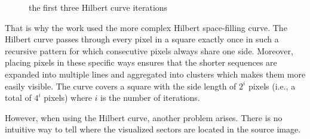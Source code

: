 \documentclass[
  digital, %
  oneside, %
  lof,     %
  lot,     %
]{fithesis4}
\begin{document}
\begin{figure}[H]
\begin{center}
\begin{minipage}{.3\textwidth}
\begin{center}
      \end{center}
    \end{minipage}
  \end{center}
  \caption{the first three Hilbert curve iterations}
  \label{fig:hilbertiters}
\end{figure}

That is why the work \cite{cortesi11} used the more complex Hilbert space-filling curve.
The Hilbert curve passes through every pixel in a square exactly once in such a recursive pattern for which consecutive pixels always share one side.\cite{hilbert91}
Moreover, placing pixels in these specific ways ensures that the shorter sequences are expanded into multiple lines and aggregated into clusters which makes them more easily visible.
The curve covers a square with the side length of $2^i$ pixels (i.e., a total of $4^i$ pixels) where $i$ is the number of iterations.

However, when using the Hilbert curve, another problem arises.
There is no intuitive way to tell where the visualized sectors are located in the source image.
\end{document}
